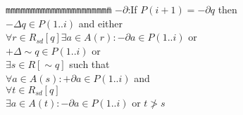 

\begin{tabbing}
{\tt mmm}\={\tt mmmmmm}\={\tt mmmm}\={\tt mmmm}\={\tt mmmm}\=\kill
\>$-\partial$:\>If $P(i + 1) = - \partial q$ then \\
\>\>$-\Delta q \in P(1..i)$ and either\\
\>\>\>$\forall r \in R_{sd}[q] \exists a \in A(r): - \partial a \in P(1..i)$ or \\
\>\>\>$+ \Delta \sim q \in P(1..i)$ or \\
\>\>\>$\exists s \in R[\sim q]$  such that\\
\>\>\>\>$\forall a\in A(s): +\partial a\in P(1..i)$ and \\
\>\>\>\>$\forall t\in R_{sd}[q]$ \\
\>\>\>\>\> $\exists a\in A(t): -\partial a\in P(1..i)$ or $t \not> s$ 
\end{tabbing}
